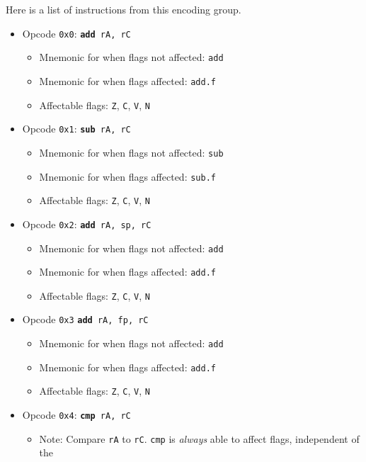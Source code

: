 \documentclass{article}
\begin{document}
	Here is a list of instructions from this encoding group.

	\singlespacing
	\begin{itemize}
		\item Opcode \texttt{0x0}:
			\texttt{\textbf{add} rA, rC}
		\begin{itemize}
			\item Mnemonic for when flags not affected: \texttt{add}
			\item Mnemonic for when flags affected: \texttt{add.f}
			\item Affectable flags:
				\texttt{Z}, \texttt{C}, \texttt{V}, \texttt{N}
		\end{itemize}
		\item Opcode \texttt{0x1}:
			\texttt{\textbf{sub} rA, rC}
		\begin{itemize}
			\item Mnemonic for when flags not affected: \texttt{sub}
			\item Mnemonic for when flags affected: \texttt{sub.f}
			\item Affectable flags:
				\texttt{Z}, \texttt{C}, \texttt{V}, \texttt{N}
		\end{itemize}
		\item Opcode \texttt{0x2}:
			\texttt{\textbf{add} rA, sp, rC}
		\begin{itemize}
			\item Mnemonic for when flags not affected: \texttt{add}
			\item Mnemonic for when flags affected: \texttt{add.f}
			\item Affectable flags:
				\texttt{Z}, \texttt{C}, \texttt{V}, \texttt{N}
		\end{itemize}
		\item Opcode \texttt{0x3}
			\texttt{\textbf{add} rA, fp, rC}
		\begin{itemize}
			\item Mnemonic for when flags not affected: \texttt{add}
			\item Mnemonic for when flags affected: \texttt{add.f}
			\item Affectable flags:
				\texttt{Z}, \texttt{C}, \texttt{V}, \texttt{N}
		\end{itemize}
		\item Opcode \texttt{0x4}:
			\texttt{\textbf{cmp} rA, rC}
		\begin{itemize}
			\item Note: Compare \texttt{rA} to \texttt{rC}. \texttt{cmp}
			is \textit{always} able to affect flags, independent of the

\end{itemize}
\end{itemize}
\end{document}
